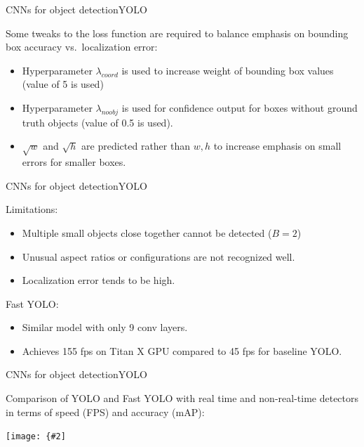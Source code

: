 \documentclass[aspectratio=169]{beamer}
\newcommand{\myfig}[3]{\centerline{\texttt{[image: \{\#2]}}}
\begin{document}
\begin{frame}{CNNs for object detection}{YOLO}

  Some tweaks to the loss function are required to balance emphasis on
  bounding box accuracy vs.\ localization error:
  \begin{itemize}
  \item Hyperparameter $\lambda_{coord}$ is used to increase weight
    of bounding box values (value of 5 is used)
  \item Hyperparameter $\lambda_{noobj}$ is used for confidence output for boxes without ground truth objects (value of 0.5 is used).
  \item $\sqrt{w}$ and $\sqrt{h}$ are predicted rather than $w,h$ to increase emphasis on small errors for smaller boxes.
  \end{itemize}

\end{frame}


\begin{frame}{CNNs for object detection}{YOLO}

  Limitations:
  \begin{itemize}
  \item Multiple small objects close together cannot be detected ($B=2$)
  \item Unusual aspect ratios or configurations are not recognized well.
  \item Localization error tends to be high.
  \end{itemize}

  \medskip

  Fast YOLO:
  \begin{itemize}
  \item Similar model with only 9 conv layers.
  \item Achieves 155 fps on Titan X GPU compared to 45 fps for baseline YOLO.
  \end{itemize}
  
\end{frame}


\begin{frame}{CNNs for object detection}{YOLO}

  Comparison of YOLO and Fast YOLO with real time and non-real-time
  detectors in terms of speed (FPS) and accuracy (mAP):

  \medskip
  
  \myfig{3in}{redmon-table1}{Redmon et al.\ (2016), Table 1}

\end{frame}
\end{document}
